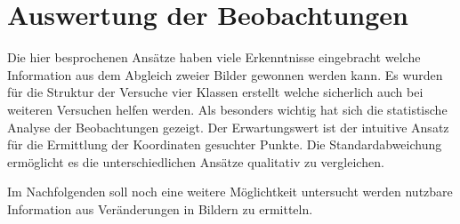 \section{Auswertung der Beobachtungen}

Die hier besprochenen Ansätze haben viele Erkenntnisse eingebracht welche Information aus dem Abgleich zweier Bilder gewonnen werden kann.
Es wurden für die Struktur der Versuche vier Klassen erstellt welche sicherlich auch bei weiteren Versuchen helfen werden.
Als besonders wichtig hat sich die statistische Analyse der Beobachtungen gezeigt.
Der Erwartungswert ist der intuitive Ansatz für die Ermittlung der Koordinaten gesuchter Punkte.
Die Standardabweichung ermöglicht es die unterschiedlichen Ansätze qualitativ zu vergleichen.

Im Nachfolgenden soll noch eine weitere Möglichtkeit untersucht werden nutzbare Information aus Veränderungen in Bildern zu ermitteln.
